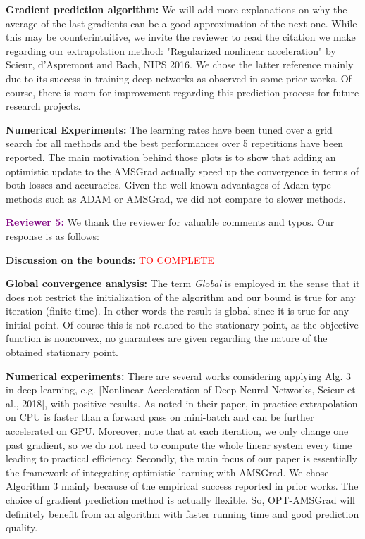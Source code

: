 \documentclass{article}
\begin{document}
\textbf{Gradient prediction algorithm:} We will add more explanations on why the average of the last gradients can be a good approximation of the next one. While this may be counterintuitive, we invite the reviewer to read the citation we make regarding our extrapolation method: "Regularized nonlinear acceleration" by Scieur, d'Aspremont and Bach, NIPS 2016.
We chose the latter reference mainly due to its success in training deep networks as observed in some prior works.
Of course, there is room for improvement regarding this prediction process for future research projects.

\textbf{Numerical Experiments:} The learning rates have been tuned over a grid search for all methods and the best performances over 5 repetitions have been reported.
The main motivation behind those plots is to show that adding an optimistic update to the AMSGrad actually speed up the convergence in terms of both losses and accuracies.
Given the well-known advantages of Adam-type methods such as ADAM or AMSGrad, we did not compare to slower methods.

\vspace{0.02in}

\textbf{\textcolor{purple}{Reviewer 5:}} We thank the reviewer for valuable comments and typos. Our response is as follows:\vspace{-5pt}

\textbf{Discussion on the bounds:} \textcolor{red}{TO COMPLETE}

\textbf{Global convergence analysis:} The term \emph{Global} is employed in the sense that it does not restrict the initialization of the algorithm and our bound is true for any iteration (finite-time). In other words the result is global since it is true for any initial point. Of course this is not related to the stationary point, as the objective function is nonconvex, no guarantees are given regarding the nature of the obtained stationary point.


\textbf{Numerical experiments:} There are several works considering applying Alg. 3 in deep learning, e.g. [Nonlinear Acceleration of Deep Neural Networks, Scieur et al., 2018], with positive results. 
As noted in their paper, in practice extrapolation on CPU is faster than a forward pass on mini-batch and can be further accelerated on GPU. 
Moreover, note that at each iteration, we only change one past gradient, so we do not need to compute the whole linear system every time leading to practical efficiency. 
Secondly, the main focus of our paper is essentially the framework of integrating optimistic learning with AMSGrad. 
We chose Algorithm 3 mainly because of the empirical success reported in prior works. The choice of gradient prediction method is actually flexible. 
So, OPT-AMSGrad will definitely benefit from an algorithm with faster running time and good prediction quality. 
\end{document}

